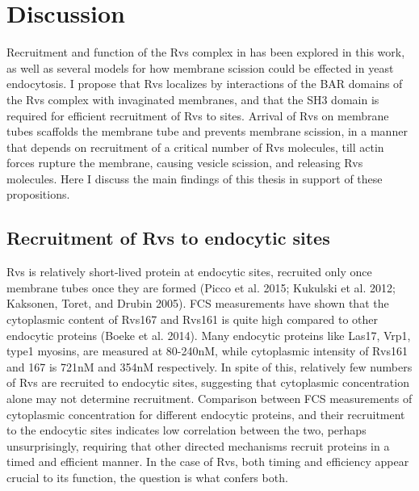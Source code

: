 
\chapter{Discussion}    
\label{Ch:discussion}

Recruitment and function of the Rvs complex in has been explored in this work, as well as several models for how membrane scission could be effected in yeast endocytosis. 
I propose that Rvs localizes by interactions of the BAR domains of the Rvs complex with invaginated membranes, and that the SH3 domain is required for efficient recruitment of Rvs to sites. Arrival of Rvs on membrane tubes scaffolds the membrane tube and prevents membrane scission, in a manner that depends on recruitment of a critical number of Rvs molecules, till actin forces rupture the membrane, causing vesicle scission, and releasing Rvs molecules. Here I discuss the main findings of this thesis in support of these propositions.



\section{Recruitment of Rvs to endocytic sites}
Rvs is relatively short-lived protein at endocytic sites, recruited only once membrane tubes once they are formed (Picco et al. 2015; Kukulski et al. 2012; Kaksonen, Toret, and Drubin 2005). FCS measurements have shown that the cytoplasmic content of Rvs167 and Rvs161 is quite high compared to other endocytic proteins (Boeke et al. 2014). Many endocytic proteins like Las17, Vrp1, type1 myosins, are measured at 80-240nM, while cytoplasmic intensity of Rvs161 and 167 is 721nM and 354nM respectively. In spite of this, relatively few numbers of Rvs are recruited to endocytic sites, suggesting that cytoplasmic concentration alone may not determine recruitment. Comparison between FCS measurements of cytoplasmic concentration for different endocytic proteins, and their recruitment to the endocytic sites indicates low correlation between the two, perhaps unsurprisingly, requiring that other directed mechanisms recruit proteins in a timed and efficient manner. In the case of Rvs, both timing and efficiency appear crucial to its function, the question is what confers both. 



